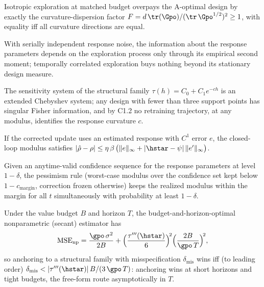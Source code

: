 \begin{corollary}
Isotropic exploration at matched budget overpays the A-optimal design by
exactly the curvature-dispersion factor
$F = d\,\tr(\Gpo)/(\tr\,\Gpo^{1/2})^2 \ge 1$, with equality iff all
curvature directions are equal.
\end{corollary}

\begin{lemma}
With serially independent response noise, the information about the
response parameters depends on the exploration process only through its
empirical second moment; temporally correlated exploration buys nothing
beyond its stationary design measure.
\end{lemma}

\begin{theorem}
The sensitivity system of the structural family
$\tau(h) = C_0 + C_1 e^{-ch}$ is an extended Chebyshev system; any design
with fewer than three support points has singular Fisher information, and
by C1.2 no retraining trajectory, at any modulus, identifies the response
curvature $c$.
\end{theorem}

\begin{lemma}
If the corrected update uses an estimated response with $C^1$ error $e$,
the closed-loop modulus satisfies
$|\hat\rho - \rho| \le \eta\,\beta\,\big(\|e\|_\infty +
|\hstar-\psi|\,\|e'\|_\infty\big)$.
\end{lemma}

\begin{proposition}
Given an anytime-valid confidence sequence for the response parameters at
level $1-\delta$, the pessimism rule (worst-case modulus over the
confidence set kept below $1 - c_{\mathrm{margin}}$, correction frozen
otherwise) keeps the realized modulus within the margin for all $t$
simultaneously with probability at least $1-\delta$.
\end{proposition}

\begin{theorem}
Under the value budget $B$ and horizon $T$, the budget-and-horizon-optimal
nonparametric (secant) estimator has
\[
\mathrm{MSE}_{\mathrm{np}} = \frac{\gpo\,\sigma^2}{2B}
+ \Big(\frac{\tau'''(\hstar)}{6}\Big)^{\!2}
\Big(\frac{2B}{\gpo\,T}\Big)^{\!2},
\]
so anchoring to a structural family with misspecification
$\delta_{\mathrm{mis}}$ wins iff (to leading order)
$\delta_{\mathrm{mis}} < |\tau'''(\hstar)|\,B/(3\,\gpo\,T)$: anchoring wins
at short horizons and tight budgets, the free-form route asymptotically in
$T$.
\end{theorem}

